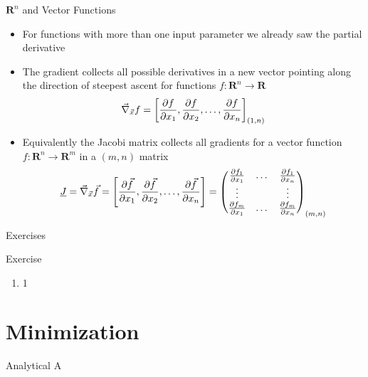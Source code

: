   \begin{frame}{$\mathbf{R}^n$ and Vector Functions}
    \begin{itemize}
      \item For functions with more than one input parameter we already saw the partial derivative
      \item The gradient collects all possible derivatives in a new vector pointing along the direction of steepest ascent for functions $f:\mathbf{R}^n\rightarrow \mathbf{R}$
      \begin{equation*}
        \vec{\nabla}_{\vec{x}} f = \left[
          \frac{\partial f}{\partial x_1}, \frac{\partial f}{\partial x_2}, \dots, \frac{\partial f}{\partial x_n} \right]_{(1, n)}
      \end{equation*}
      \item Equivalently the Jacobi matrix collects all gradients for a vector function $f:\mathbf{R}^n\rightarrow\mathbf{R}^m$ in a $(m, n)$ matrix
      \begin{equation*}
        \underline{J} = \vec{\nabla}_{\vec{x}} \vec{f} = \left[
          \frac{\partial \vec{f}}{\partial x_1}, \frac{\partial \vec{f}}{\partial x_2}, \dots, \frac{\partial \vec{f}}{\partial x_n} \right] =
          \begin{pmatrix}
            \frac{\partial f_1}{\partial x_1} & \dots & \frac{\partial f_1}{\partial x_n} \\
            \vdots & & \vdots \\
            \frac{\partial f_m}{\partial x_1} & \dots & \frac{\partial f_m}{\partial x_n}
          \end{pmatrix}_{(m, n)}
      \end{equation*}
    \end{itemize}
  \end{frame}

  \begin{frame}{Exercises}
    \begin{exampleblock}{Exercise}
      \begin{enumerate}
        \item 1
      \end{enumerate}
    \end{exampleblock}
  \end{frame}

  \section{Minimization}
  \begin{frame}{Analytical}
    A
  \end{frame}

